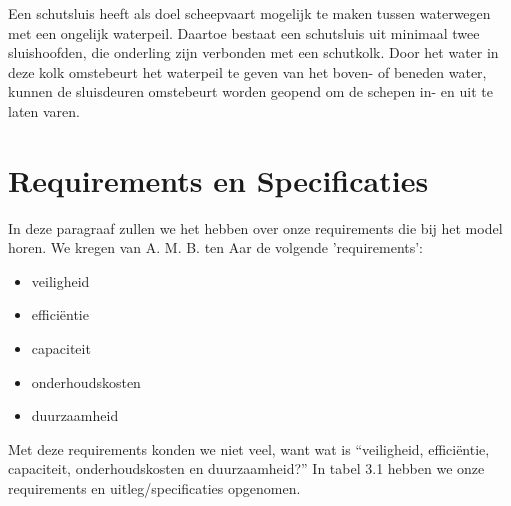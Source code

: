\documentclass[oneside]{scrbook}
\begin{document}
Een schutsluis heeft als doel scheepvaart mogelijk te maken tussen waterwegen met een ongelijk waterpeil. Daartoe bestaat een schutsluis uit minimaal twee sluishoofden, die onderling zijn verbonden met een schutkolk. Door het water in deze kolk omstebeurt het waterpeil te geven van het boven- of beneden water, kunnen de sluisdeuren omstebeurt worden geopend om de schepen in- en uit te laten varen\cite{arends1994sluizen}.

\section{Requirements en Specificaties}
In deze paragraaf zullen we het hebben over onze requirements die bij het model horen. We kregen van A. M. B. ten Aar de volgende 'requirements':
\begin{itemize}
    \item veiligheid
    \item efficiëntie
    \item capaciteit
    \item onderhoudskosten
    \item duurzaamheid
\end{itemize}

Met deze requirements konden we niet veel, want wat is \enquote{veiligheid, efficiëntie, capaciteit, onderhoudskosten en duurzaamheid?} In tabel 3.1 hebben we onze requirements en uitleg/specificaties opgenomen.
\end{document}
